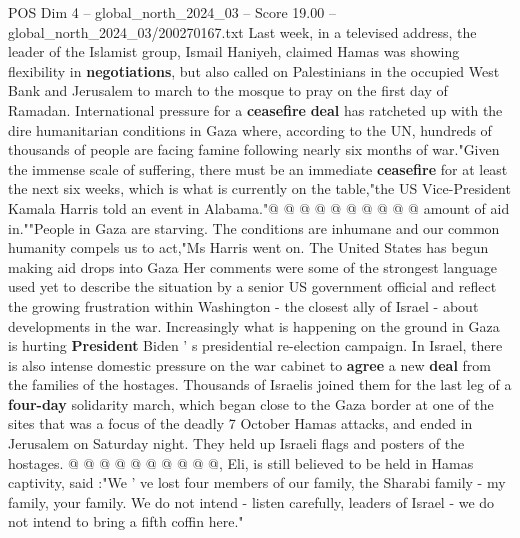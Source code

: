 \begin{textsample}{POS Dim 4 – global\_north\_2024\_03 – Score 19.00 – global\_north\_2024\_03/200270167.txt}
Last week, in a televised address, the leader of the Islamist group, Ismail Haniyeh, claimed Hamas was showing flexibility in \textbf{negotiations}, but also called on Palestinians in the occupied West Bank and Jerusalem to march to the mosque to pray on the first day of Ramadan.
International pressure for a \textbf{ceasefire} \textbf{deal} has ratcheted up with the dire humanitarian conditions in Gaza where, according to the UN, hundreds of thousands of people are facing famine following nearly six months of war."Given the immense scale of suffering, there must be an immediate \textbf{ceasefire} for at least the next six weeks, which is what is currently on the table,"the US Vice-President Kamala Harris told an event in Alabama."@ @ @ @ @ @ @ @ @ @ amount of aid in.""People in Gaza are starving.
The conditions are inhumane and our common humanity compels us to act,"Ms Harris went on.
The United States has begun making aid drops into Gaza Her comments were some of the strongest language used yet to describe the situation by a senior US government official and reflect the growing frustration within Washington - the closest ally of Israel - about developments in the war.
Increasingly what is happening on the ground in Gaza is hurting \textbf{President} Biden ' s presidential re-election campaign.
In Israel, there is also intense domestic pressure on the war cabinet to \textbf{agree} a new \textbf{deal} from the families of the hostages.
Thousands of Israelis joined them for the last leg of a \textbf{four-day} solidarity march, which began close to the Gaza border at one of the sites that was a focus of the deadly 7 October Hamas attacks, and ended in Jerusalem on Saturday night.
They held up Israeli flags and posters of the hostages. @ @ @ @ @ @ @ @ @ @, Eli, is still believed to be held in Hamas captivity, said :"We ' ve lost four members of our family, the Sharabi family - my family, your family.
We do not intend - listen carefully, leaders of Israel - we do not intend to bring a fifth coffin here."

\end{textsample}
